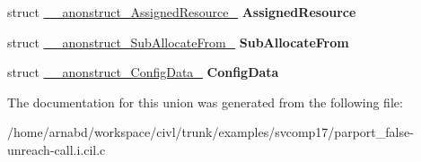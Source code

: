 \begin{DoxyCompactItemize}
\item 
\hypertarget{union____anonunion__u__24_a08e2bb3e2c8280f0aca61c87a470fb3c}{}struct \hyperlink{struct____anonstruct__AssignedResource__32}{\+\_\+\+\_\+anonstruct\+\_\+\+Assigned\+Resource\+\_} {\bfseries Assigned\+Resource}\label{union____anonunion__u__24_a08e2bb3e2c8280f0aca61c87a470fb3c}

\item 
\hypertarget{union____anonunion__u__24_a694c2db5c9f68571091dfadae34cebac}{}struct \hyperlink{struct____anonstruct__SubAllocateFrom__33}{\+\_\+\+\_\+anonstruct\+\_\+\+Sub\+Allocate\+From\+\_} {\bfseries Sub\+Allocate\+From}\label{union____anonunion__u__24_a694c2db5c9f68571091dfadae34cebac}

\item 
\hypertarget{union____anonunion__u__24_ac341f687fa726dd1f3df9af430f577b1}{}struct \hyperlink{struct____anonstruct__ConfigData__34}{\+\_\+\+\_\+anonstruct\+\_\+\+Config\+Data\+\_} {\bfseries Config\+Data}\label{union____anonunion__u__24_ac341f687fa726dd1f3df9af430f577b1}

\end{DoxyCompactItemize}


The documentation for this union was generated from the following file\+:\begin{DoxyCompactItemize}
\item 
/home/arnabd/workspace/civl/trunk/examples/svcomp17/parport\+\_\+false-\/unreach-\/call.\+i.\+cil.\+c\end{DoxyCompactItemize}
